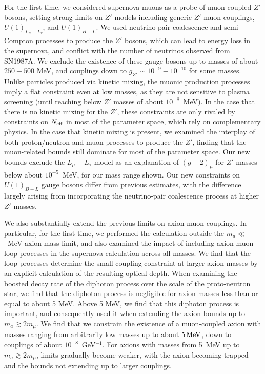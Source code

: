 \documentclass[11pt]{article}
\begin{document}
For the first time, we considered supernova muons as a probe of muon-coupled $Z'$ bosons, setting strong limits on $Z'$ models including generic $Z'$-muon couplings, $U(1)_{L_\mu-L_\tau}$, and $U(1)_{B-L}$. We used neutrino-pair coalescence and semi-Compton processes to produce the $Z'$ bosons, which can lead to energy loss in the supernova, and conflict with the number of neutrinos observed from SN1987A. We exclude the existence of these gauge bosons up to masses of about $250-500$ MeV, and couplings down to $g_{Z'} \sim10^{-9}-10^{-10}$ for some masses. 
Unlike particles produced via kinetic mixing, the muonic production processes imply a flat constraint even at low masses, as they are not sensitive to plasma screening (until reaching below $Z'$ masses of about $10^{-8}$~MeV). 
In the case that there is no kinetic mixing for the $Z'$, these constraints are only rivaled by constraints on $N_{\rm eff}$ in most of the parameter space, which rely on complementary physics. In the case that kinetic mixing is present, we examined the interplay of both proton/neutron and muon processes to produce the $Z'$, finding that the muon-related bounds still dominate for most of the parameter space. Our new bounds exclude the $L_\mu-L_\tau$ model as an explanation of $(g-2)_\mu$ for $Z'$ masses below about $10^{-5}$~MeV, for our mass range shown. Our new constraints on $U(1)_{B-L}$ gauge bosons differ from previous estimates, with the difference largely arising from incorporating the neutrino-pair coalescence process at higher $Z'$ masses.

We also substantially extend the previous limits on axion-muon couplings. In particular, for the first time, we performed the calculation outside the $m_a\ll$~MeV axion-mass limit, and also examined the impact of including axion-muon loop processes in the supernova calculation across all masses. We find that the loop processes determine the small coupling constraint at larger axion masses by an explicit calculation of the resulting optical depth. When examining the boosted decay rate of the diphoton process over the scale of the proto-neutron star, we find that the diphoton process is negligible for axion masses less than or equal to about 5 MeV. Above 5 MeV, we find that this diphoton process is important, and consequently used it when extending the axion bounds up to $m_a\gtrsim 2m_\mu$. We find that we constrain the existence of a muon-coupled axion with masses ranging from arbitrarily low masses up to about $5 \operatorname{MeV}$, down to couplings of about $10^{-8}$~GeV$^{-1}$. For axions with masses from 5~MeV up to $m_a \gtrsim 2m_\mu$, limits gradually become weaker, with the axion becoming trapped and the bounds not extending up to larger couplings.
\end{document}

